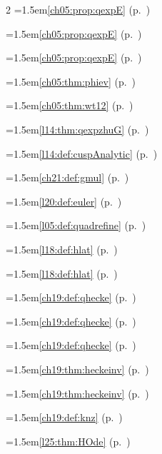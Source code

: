 \begin{multicols}{2}
\hangindent=1.5em\quad \ref{ch05:prop:qexpE} (p.~\pageref{ch05:prop:qexpE})\par
\hangindent=1.5em\quad \ref{ch05:prop:qexpE} (p.~\pageref{ch05:prop:qexpE})\par
\hangindent=1.5em\quad \ref{ch05:prop:qexpE} (p.~\pageref{ch05:prop:qexpE})\par
\hangindent=1.5em\quad \ref{ch05:thm:phiev} (p.~\pageref{ch05:thm:phiev})\par
\hangindent=1.5em\quad \ref{ch05:thm:wt12} (p.~\pageref{ch05:thm:wt12})\par
\hangindent=1.5em\quad \ref{l14:thm:qexpzhuG} (p.~\pageref{l14:thm:qexpzhuG})\par
\hangindent=1.5em\quad \ref{l14:def:cuspAnalytic} (p.~\pageref{l14:def:cuspAnalytic})\par
\hangindent=1.5em\quad \ref{ch21:def:gmul} (p.~\pageref{ch21:def:gmul})\par
\hangindent=1.5em\quad \ref{l20:def:euler} (p.~\pageref{l20:def:euler})\par
\hangindent=1.5em\quad \ref{l05:def:quadrefine} (p.~\pageref{l05:def:quadrefine})\par
\hangindent=1.5em\quad \ref{l18:def:hlat} (p.~\pageref{l18:def:hlat})\par
\hangindent=1.5em\quad \ref{l18:def:hlat} (p.~\pageref{l18:def:hlat})\par
\hangindent=1.5em\quad \ref{ch19:def:qhecke} (p.~\pageref{ch19:def:qhecke})\par
\hangindent=1.5em\quad \ref{ch19:def:qhecke} (p.~\pageref{ch19:def:qhecke})\par
\hangindent=1.5em\quad \ref{ch19:def:qhecke} (p.~\pageref{ch19:def:qhecke})\par
\hangindent=1.5em\quad \ref{ch19:thm:heckeinv} (p.~\pageref{ch19:thm:heckeinv})\par
\hangindent=1.5em\quad \ref{ch19:thm:heckeinv} (p.~\pageref{ch19:thm:heckeinv})\par
\hangindent=1.5em\quad \ref{ch19:def:knz} (p.~\pageref{ch19:def:knz})\par
\hangindent=1.5em\quad \ref{l25:thm:HOde} (p.~\pageref{l25:thm:HOde})\par

\end{multicols}
